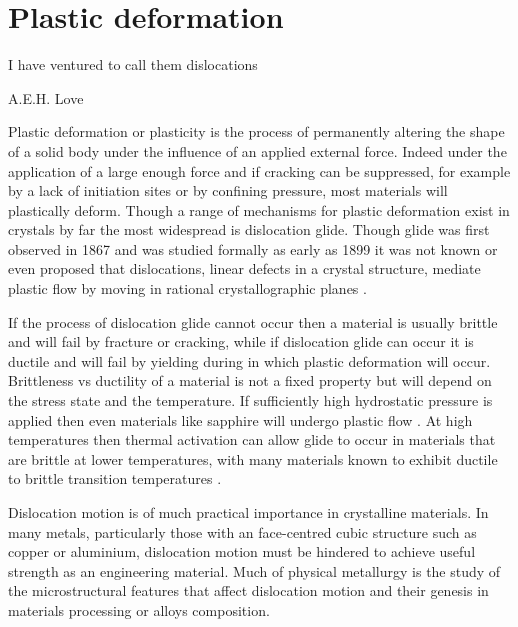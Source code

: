 
\chapter{Plastic deformation}  %
\label{chap:plastic_deformation}

\epigraph{I have ventured to call them dislocations}{A.E.H. Love}




\graphicspath{{plastic_deformation/Figs/}}

Plastic deformation or plasticity is the process of permanently altering the shape of a solid body under the influence of an applied external force. Indeed under the application of a large enough force and if cracking can be suppressed, for example by a lack of initiation sites or by confining pressure, most materials will plastically deform. Though a range of mechanisms for plastic deformation exist in crystals by far the most widespread is dislocation glide. Though glide was first observed in 1867 \cite{Reusch1867} and was studied formally as early as 1899 \cite{Ewing1899,Ewing1900} it was not known or even proposed that dislocations, linear defects in a crystal structure, mediate plastic flow by moving in rational crystallographic planes \cite{Kelly2012ch7}.

If the process of dislocation glide cannot occur then a material is usually {brittle} and will fail by fracture or cracking, while if dislocation glide can occur it is {ductile} and will fail by yielding during in which plastic deformation will occur. Brittleness vs ductility of a material is not a fixed property but will depend on the stress state and the temperature. If sufficiently high hydrostatic pressure is applied then even materials like sapphire will undergo plastic flow \cite{Bridgman1947}. At high temperatures then thermal activation can allow glide to occur in materials that are brittle at lower temperatures, with many materials known to exhibit ductile to brittle transition temperatures   \cite{Kelly2012ch7}.

Dislocation motion is of much practical importance in crystalline materials. In many metals, particularly those with an face-centred cubic structure such as copper or aluminium, dislocation motion must be hindered to achieve useful strength as an engineering material. Much of physical metallurgy is the study of the microstructural features that affect dislocation motion and their genesis in materials processing or alloys composition.

